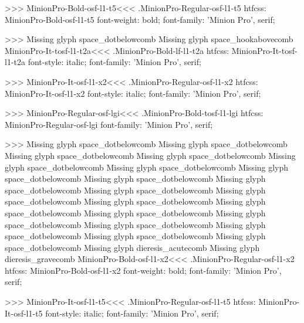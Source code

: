 {>>>
\<MinionPro-Bold-osf-l1-t5\><<<
.MinionPro-Regular-osf-l1-t5
htfcss:  MinionPro-Bold-osf-l1-t5  font-weight: bold; font-family: 'Minion Pro', serif;

>>>
Missing glyph	space_dotbelowcomb
Missing glyph	space_hookabovecomb
\<MinionPro-It-tosf-l1-t2a\><<<
.MinionPro-Bold-lf-l1-t2a
htfcss:  MinionPro-It-tosf-l1-t2a  font-style: italic; font-family: 'Minion Pro', serif;

>>>
\<MinionPro-It-osf-l1-x2\><<<
.MinionPro-Regular-osf-l1-x2
htfcss:  MinionPro-It-osf-l1-x2  font-style: italic; font-family: 'Minion Pro', serif;

>>>
\<MinionPro-Regular-osf-lgi\><<<
.MinionPro-Bold-tosf-l1-lgi
htfcss:  MinionPro-Regular-osf-lgi  font-family: 'Minion Pro', serif;

>>>
Missing glyph	space_dotbelowcomb
Missing glyph	space_dotbelowcomb
Missing glyph	space_dotbelowcomb
Missing glyph	space_dotbelowcomb
Missing glyph	space_dotbelowcomb
Missing glyph	space_dotbelowcomb
Missing glyph	space_dotbelowcomb
Missing glyph	space_dotbelowcomb
Missing glyph	space_dotbelowcomb
Missing glyph	space_dotbelowcomb
Missing glyph	space_dotbelowcomb
Missing glyph	space_dotbelowcomb
Missing glyph	space_dotbelowcomb
Missing glyph	space_dotbelowcomb
Missing glyph	space_dotbelowcomb
Missing glyph	space_dotbelowcomb
Missing glyph	space_dotbelowcomb
Missing glyph	space_dotbelowcomb
Missing glyph	space_dotbelowcomb
Missing glyph	dieresis_acutecomb
Missing glyph	dieresis_gravecomb
\<MinionPro-Bold-osf-l1-x2\><<<
.MinionPro-Regular-osf-l1-x2
htfcss:  MinionPro-Bold-osf-l1-x2  font-weight: bold; font-family: 'Minion Pro', serif;

>>>
\<MinionPro-It-osf-l1-t5\><<<
.MinionPro-Regular-osf-l1-t5
htfcss:  MinionPro-It-osf-l1-t5  font-style: italic; font-family: 'Minion Pro', serif;

}
